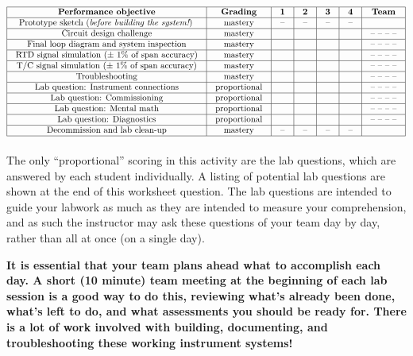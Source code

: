 \documentclass[12pt,a4paper]{article}
\begin{document}
\begin{itemize}


$$\vbox{\offinterlineskip
\halign{\strut
\vrule \quad\hfil # \ \hfil & 
\vrule \quad\hfil # \ \hfil & 
\vrule \quad\hfil # \ \hfil & 
\vrule \quad\hfil # \ \hfil & 
\vrule \quad\hfil # \ \hfil & 
\vrule \quad\hfil # \ \hfil & 
\vrule \quad\hfil # \ \hfil \vrule \cr
\noalign{\hrule}
%
{\bf Performance objective} & {\bf Grading} & {\bf 1} & {\bf 2} & {\bf 3} & {\bf 4} & {\bf Team} \cr
%
\noalign{\hrule}
%
Prototype sketch ({\it before building the system!}) & mastery & -- & -- & -- & -- & \cr
%
\noalign{\hrule}
%
Circuit design challenge & mastery & & & & & -- -- -- -- \cr
%
\noalign{\hrule}
%
Final loop diagram and system inspection & mastery & & & & & -- -- -- -- \cr
%
\noalign{\hrule}
%
RTD signal simulation ($\pm$ 1\% of span accuracy) & mastery & & & & & -- -- -- -- \cr
%
\noalign{\hrule}
%
T/C signal simulation ($\pm$ 1\% of span accuracy) & mastery & & & & & -- -- -- -- \cr
%
\noalign{\hrule}
%
Troubleshooting & mastery & & & & & -- -- -- -- \cr
%
\noalign{\hrule}
%
Lab question: Instrument connections & proportional &  &  &  &  & -- -- -- -- \cr
%
\noalign{\hrule}
%
Lab question: Commissioning & proportional &  &  &  &  & -- -- -- -- \cr
%
\noalign{\hrule}
%
Lab question: Mental math & proportional &  &  &  &  & -- -- -- -- \cr
%
\noalign{\hrule}
%
Lab question: Diagnostics & proportional &  &  &  &  & -- -- -- -- \cr
%
\noalign{\hrule}
%
Decommission and lab clean-up & mastery & -- & -- & -- & -- &  \cr
%
\noalign{\hrule}
} %
}$$ %

The only ``proportional'' scoring in this activity are the lab questions, which are answered by each student individually.  A listing of potential lab questions are shown at the end of this worksheet question.  The lab questions are intended to guide your labwork as much as they are intended to measure your comprehension, and as such the instructor may ask these questions of your team day by day, rather than all at once (on a single day).

\vskip 10pt

{\bf It is essential that your team plans ahead what to accomplish each day.  A short (10 minute) team meeting at the beginning of each lab session is a good way to do this, reviewing what's already been done, what's left to do, and what assessments you should be ready for.  There is a lot of work involved with building, documenting, and troubleshooting these working instrument systems!}


\end{itemize}
\end{document}
